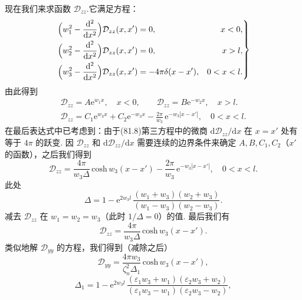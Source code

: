 现在我们来求函数 $\mathcal{D}_{zz}$.它满足方程：
\begin{equation}
  \left.\begin{aligned}
    \Bigl(w_1^{2}-\frac{\mathrm{d}^{2}}{\mathrm{d}x^{2}}\Bigr)\mathcal{D}_{zz}(x,x')&=0, & x<0,\\
    \Bigl(w_2^{2}-\frac{\mathrm{d}^{2}}{\mathrm{d}x^{2}}\Bigr)\mathcal{D}_{zz}(x,x')&=0, & x>l,\\
    \Bigl(w_3^{2}-\frac{\mathrm{d}^{2}}{\mathrm{d}x^{2}}\Bigr)\mathcal{D}_{zz}(x,x')&=-4\pi\delta(x-x'), & 0<x<l.
  \end{aligned}\right\}
\end{equation}
由此得到
\begin{equation*}
  \begin{gathered}
    \mathcal{D}_{zz}=A\mathrm{e}^{w_1 x},\quad x<0,\qquad \mathcal{D}_{zz}=B\mathrm{e}^{-w_2 x},\quad x>l.\\
    \mathcal{D}_{zz}=C_1\mathrm{e}^{w_3 x}+C_2\mathrm{e}^{-w_3 x}-\frac{2\pi}{w_3}\,\mathrm{e}^{-w_3|x-x'|},\quad 0<x<l.
  \end{gathered}
\end{equation*}
在最后表达式中已考虑到：由于(81.8)第三方程中的微商 $\mathrm{d}\mathcal{D}_{zz}/\mathrm{d}x$ 在 $x=x'$ 处有等于 $4\pi$ 的跃变. 因 $\mathcal{D}_{zz}$ 和 $\mathrm{d}\mathcal{D}_{zz}/\mathrm{d}x$ 需要连续的边界条件来确定 $A,B,C_1,C_2$（$x'$ 的函数），之后我们得到
\begin{equation*}
  \mathcal{D}_{zz}=\frac{4\pi}{w_3\Delta}\,\mathrm{cosh}\,w_3(x-x')-\frac{2\pi}{w_3}\,\mathrm{e}^{-w_3|x-x'|},\quad 0<x<l.
\end{equation*}
此处
\begin{equation*}
  \Delta=1-\mathrm{e}^{2w_3 l}\,\frac{(w_1+w_3)(w_2+w_3)}{(w_1-w_3)(w_2-w_3)}.
\end{equation*}
减去 $\mathcal{D}_{zz}$ 在 $w_1=w_2=w_3$（此时 $1/\Delta=0$）的值. 最后我们有
\begin{equation*}
  \mathcal{D}_{zz}=\frac{4\pi}{w_3\Delta}\,\mathrm{cosh}\,w_3(x-x').
\end{equation*}
类似地解 $\mathcal{D}_{yy}$ 的方程，我们得到（减除之后）
\begin{equation*}
  \mathcal{D}_{yy}=\frac{4\pi w_3}{\zeta_n^{2}\Delta_1}\,\mathrm{cosh}\,w_3(x-x'),
\end{equation*}
\begin{equation*}
  \Delta_1=1-\mathrm{e}^{2w_3 l}\,\frac{(\varepsilon_1 w_3+w_1)(\varepsilon_2 w_3+w_2)}{(\varepsilon_1 w_3-w_1)(\varepsilon_2 w_3-w_2)},
\end{equation*}
